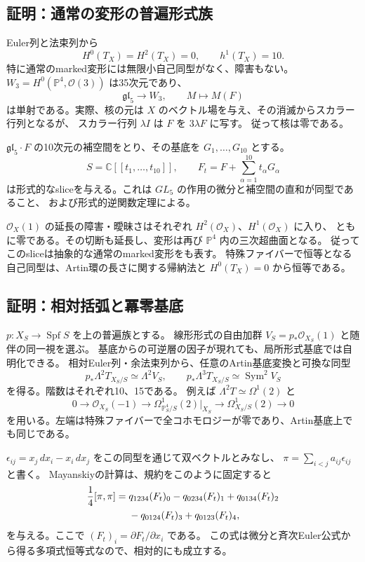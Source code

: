 \documentclass[a4paper,11pt]{ltjsarticle}
\theoremstyle{definition}
\newcommand{\CC}{\mathbb C}
\newcommand{\OO}{\mathcal O}
\newcommand{\PP}{\mathbb P}
\newcommand{\Spf}{\operatorname{Spf}}
\newcommand{\Sym}{\operatorname{Sym}}
\begin{document}
\subsection{証明：通常の変形の普遍形式族}

Euler列と法束列から
\[
 H^0(T_X)=H^2(T_X)=0,\qquad h^1(T_X)=10.
\]
特に通常のmarked変形には無限小自己同型がなく、障害もない。
$W_3=H^0(\PP^4,\OO(3))$ は35次元であり、
\[
 \mathfrak{gl}_5\longrightarrow W_3,\qquad M\longmapsto M(F)
\]
は単射である。実際、核の元は $X$ のベクトル場を与え、その消滅からスカラー行列となるが、
スカラー行列 $\lambda I$ は $F$ を $3\lambda F$ に写す。
従って核は零である。

$\mathfrak{gl}_5\cdot F$ の10次元の補空間をとり、その基底を $G_1,\ldots,G_{10}$ とする。
\[
 S=\CC[[t_1,\ldots,t_{10}]],\qquad
 F_t=F+\sum_{\alpha=1}^{10}t_\alpha G_\alpha
\]
は形式的なsliceを与える。これは $GL_5$ の作用の微分と補空間の直和が同型であること、
および形式的逆関数定理による。

$\OO_X(1)$ の延長の障害・曖昧さはそれぞれ $H^2(\OO_X)$、$H^1(\OO_X)$ に入り、
ともに零である。その切断も延長し、変形は再び $\PP^4$ 内の三次超曲面となる。
従ってこのsliceは抽象的な通常のmarked変形をも表す。
特殊ファイバーで恒等となる自己同型は、Artin環の長さに関する帰納法と
$H^0(T_X)=0$ から恒等である。

\subsection{証明：相対括弧と冪零基底}

$p:X_S\to\Spf S$ を上の普遍族とする。
線形形式の自由加群 $V_S=p_*\OO_{X_S}(1)$ と随伴の同一視を選ぶ。
基底からの可逆層の因子が現れても、局所形式基底では自明化できる。
相対Euler列・余法束列から、任意のArtin基底変換と可換な同型
\[
 p_*\Lambda^2T_{X_S/S}\simeq\Lambda^2 V_S,\qquad
 p_*\Lambda^3T_{X_S/S}\simeq\Sym^2V_S
\]
を得る。階数はそれぞれ10、15である。
例えば $\Lambda^2T\simeq\Omega^1(2)$ と
\[
 0\longrightarrow\OO_{X_S}(-1)
 \longrightarrow\Omega^1_{\PP^4_S/S}(2)|_{X_S}
 \longrightarrow\Omega^1_{X_S/S}(2)\longrightarrow0
\]
を用いる。左端は特殊ファイバーで全コホモロジーが零であり、Artin基底上でも同じである。

$\epsilon_{ij}=x_j\,dx_i-x_i\,dx_j$ をこの同型を通じて双ベクトルとみなし、
$\pi=\sum_{i<j}a_{ij}\epsilon_{ij}$ と書く。
Mayanskiyの計算は、規約をこのように固定すると
\begin{align}
 \frac14[\pi,\pi]
 ={}&q_{1234}(F_t)_0-q_{0234}(F_t)_1+q_{0134}(F_t)_2 \notag\\
    &-q_{0124}(F_t)_3+q_{0123}(F_t)_4, \label{eq:bracket}
\end{align}
を与える。ここで $(F_t)_i=\partial F_t/\partial x_i$ である。
この式は微分と斉次Euler公式から得る多項式恒等式なので、相対的にも成立する。
\end{document}
